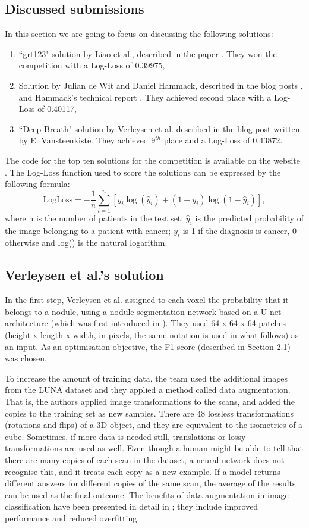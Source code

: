 \documentclass[12pt]{article}
\begin{document}
\subsection{Discussed submissions}
In this section we are going to focus on discussing the following solutions:
\begin{enumerate}
\item ``grt123" solution by Liao et al., described in the paper \citep{liao2017evaluate}. They won the competition with a Log-Loss of 0.39975,
\item Solution by Julian de Wit and Daniel Hammack, described in the blog posts \citep{dewit},\citep{hammack} and Hammack's technical report \citep{Hammack2}. They achieved second place with a Log-Loss of 0.40117,
\item ``Deep Breath" solution by Verleysen et al. described in the blog post \citep{deepbreath} written by E. Vansteenkiste. They achieved $9^{th}$ place and a Log-Loss of 0.43872.
\end{enumerate}
The code for the top ten solutions for the competition is available on the website \citep{top10}. The Log-Loss function used to score the solutions can be expressed by the following formula: 
$$\textrm{LogLoss} = - \frac{1}{n} \sum_{i=1}^n \left[ y_i \log(\hat{y}_i) + (1 - y_i) \log(1 - \hat{y}_i)\right],$$
where n is the number of patients in the test set; $\hat{y}_i$ is the predicted probability of the image belonging to a patient with cancer; $y_i$ is 1 if the diagnosis is cancer, 0 otherwise and log() is the natural logarithm.

\subsection{Verleysen et al.'s solution}
In the first step, Verleysen et al. assigned to each voxel the probability that it belongs to a nodule, using a nodule segmentation network based on a U-net architecture (which was first introduced in \citep{ronneberger2015u}). They used 64 x 64 x 64 patches (height x length x width, in pixels, the same notation is used in what follows) as an input. As an optimisation objective, the F1 score (described in Section 2.1) was chosen.

To increase the amount of training data, the team used the additional images from the LUNA dataset and they applied a method called data augmentation. That is, the authors applied image transformations to the scans, and added the copies to the training set as new samples. There are 48 lossless transformations (rotations and flips) of a 3D object, and they are equivalent to the isometries of a cube. Sometimes, if more data is needed still, translations or lossy transformations are used as well. Even though a human might be able to tell that there are many copies of each scan in the dataset, a neural network does not recognise this, and it treats each copy as a new example. If a model returns different answers for different copies of the same scan, the average of the results can be used as the final outcome. The benefits of data augmentation in image classification have been presented in detail in \citep{wong2016understanding}; they include improved performance and reduced overfitting.
\end{document}
